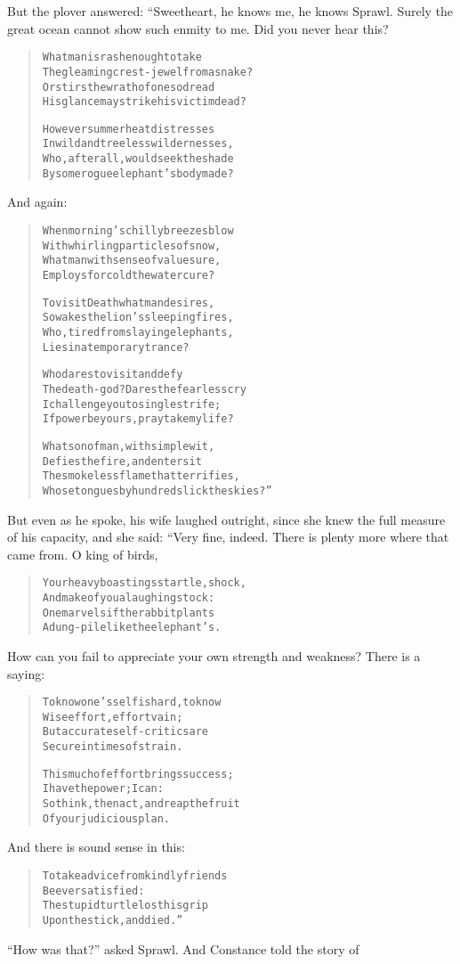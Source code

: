\documentclass[article, twoside, 14pt]{memoir}
\renewenvironment{verbatim}{%
\begin{quote}%
\vskip -10pt%
\begin{alltt}\normalfont\large}{\end{alltt}%
\end{quote}%
\vskip -10pt
} %
\begin{document}
But the plover answered: “Sweetheart, he knows me, he knows Sprawl.
Surely the great ocean cannot show such enmity to me. Did you never
hear this?

\begin{verbatim}
What man is rash enough to take
The gleaming crest-jewel from a snake?
Or stirs the wrath of one so dread
His glance may strike his victim dead?

However summer heat distresses
In wild and treeless wildernesses,
Who, after all, would seek the shade
By some rogue elephant's body made?
\end{verbatim}
And again:

\begin{verbatim}
When morning's chilly breezes blow
With whirling particles of snow,
What man with sense of value sure,
Employs for cold the water cure?

To visit Death what man desires,
So wakes the lion's sleeping fires,
Who, tired from slaying elephants,
Lies in a temporary trance?

Who dares to visit and defy
The death-god? Dares the fearless cry{\textemdash}
I challenge you to single strife;
If power be yours, pray take my life?

What son of man, with simple wit,
Defies the fire, and enters it{\textemdash}
The smokeless flame that terrifies,
Whose tongues by hundreds lick the skies?”
\end{verbatim}
But even as he spoke, his wife laughed outright, since she knew the
full measure of his capacity, and she said: “Very fine, indeed.
There is plenty more where that came from. O king of birds,

\begin{verbatim}
Your heavy boastings startle, shock,
And make of you a laughingstock:
One marvels if the rabbit plants
A dung-pile like the elephant's.
\end{verbatim}
How can you fail to appreciate your own strength and weakness?
There is a saying:

\begin{verbatim}
To know one's self is hard, to know
Wise effort, effort vain;
But accurate self-critics are
Secure in times of strain.

This much of effort brings success;
I have the power; I can:
So think, then act, and reap the fruit
Of your judicious plan.
\end{verbatim}
And there is sound sense in this:

\begin{verbatim}
To take advice from kindly friends
Be ever satisfied:
The stupid turtle lost his grip
Upon the stick, and died.”
\end{verbatim}
``How was that?'' asked Sprawl. And Constance told the story of
\end{document}
